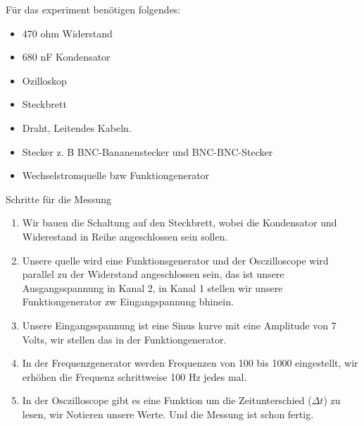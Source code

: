 Für das experiment benötigen folgendes:
\begin{itemize}
    \item 470 ohm Widerstand
    \item 680 nF Kondensator
    \item Ozilloskop
    \item Steckbrett
    \item Draht, Leitendes Kabeln. 
    \item Stecker z. B BNC-Bananenstecker und BNC-BNC-Stecker
    \item Wechselstromquelle bzw Funktiongenerator
\end{itemize}

Schritte für die Messung
\begin{enumerate}
    \item Wir bauen die Schaltung auf den Steckbrett, wobei die Kondensator und Widerestand in Reihe angeschlossen sein sollen.
    \item Unsere quelle wird eine Funktionsgenerator und der Osczilloscope wird parallel zu der Widerstand angeschlossen sein, das ist unsere Ausgangsspannung in Kanal 2, in Kanal 1 stellen wir unsere Funktiongenerator zw Eingangspannung bhinein.
    \item Unsere Eingangsspannung ist eine Sinus kurve mit eine Amplitude von 7 Volts, wir stellen das in der Funktiongenerator.
    \item In der Frequenzgenerator werden Frequenzen von 100 bis 1000 eingestellt, wir erhöhen die Frequenz schrittweise 100 Hz jedes mal.
    \item In der Osczilloscope gibt es eine Funktion um die  Zeitunterschied ($\Delta t$) zu lesen, wir Notieren unsere Werte. Und die Messung ist schon fertig.
\end{enumerate}
%
%
%
%
%
%
%
\newpage
